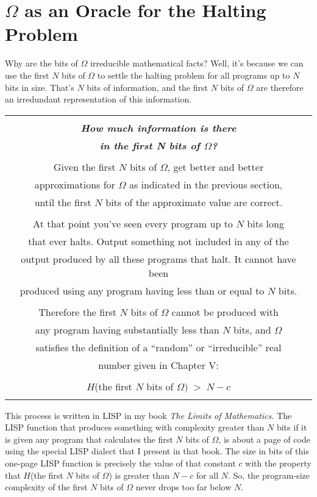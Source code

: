 \documentclass[12pt]{book}
\begin{document}
\section*{$\Omega$ as an Oracle for the Halting Problem}

Why are the bits of $\Omega$ irreducible mathematical facts? Well, it's because
we can use the first $N$ bits of $\Omega$ to settle the halting problem for all
programs up to $N$ bits in size.
That's $N$ bits of information, and the first $N$ bits of $\Omega$ are therefore an irredundant
representation of this information.

\begin{center}
\begin{tabular}{|c|}
\hline
\\
\textbf{\large \emph{How much information is there}}
\\
\textbf{\large \emph{in the first N bits of $\Omega$?}}
\\ \\
Given the first $N$ bits of $\Omega$, get better and better
\\
approximations for $\Omega$ as indicated in the previous section,
\\
until the first $N$ bits of the approximate value are correct.
\\ \\
At that point you've seen every program up to $N$ bits long
\\
that ever halts. Output something not included in any of the 
\\
output produced by all these programs that halt.  It cannot have been
\\
produced using any program having less than or equal to $N$ bits.
\\ \\
Therefore the first $N$ bits of $\Omega$ cannot be produced with 
\\
any program having substantially less than $N$ bits, and $\Omega$
\\
satisfies the definition of a ``random'' or ``irreducible'' real
\\
number given in Chapter V:
\\ \\
$H$(the first $N$ bits of $\Omega) \; > \; N - c$
\\
\\
\hline
\end{tabular}
\end{center}
 
This process is written in LISP in my book \emph{The Limits of Mathematics.}
The LISP function that produces something with complexity greater than $N$ bits if it is
given any program that calculates the first $N$ bits of $\Omega$,
is about a page of code using the special LISP dialect that I present in that book.
The size in bits of this one-page LISP function is precisely the value of that
constant $c$ with the property that 
$H$(the first $N$ bits of $\Omega$) is greater than $N - c$ for all $N$.
So, the program-size complexity of the first $N$ bits of $\Omega$ never drops
too far below $N$.
 
\end{document}
